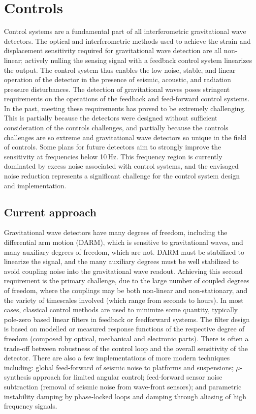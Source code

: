 \section{Controls}
\label{sec:Controls}
Control systems are a fundamental part of all interferometric gravitational wave detectors. The optical and interferometric methods used to achieve the strain and displacement sensitivity required for gravitational wave detection are all non-linear; actively nulling the sensing signal with a feedback control system linearizes the output. 
The control system thus enables the low noise, stable, and linear operation of the detector in the presence of seismic, acoustic, and radiation pressure disturbances.
The detection of gravitational waves poses stringent requirements on the operations of the feedback and feed-forward control systems.
In the past, meeting these requirements has proved to be extremely challenging.
This is partially because the detectors were designed without sufficient consideration of the controls challenges, and partially because the controls challenges are so extreme and gravitational wave detectors so unique in the field of controls.
Some plans for future detectors aim to strongly improve the sensitivity at frequencies below 10\,Hz. This frequency region is currently dominated by excess noise associated with control systems, and the envisaged noise reduction represents a significant challenge for the control system design and implementation.

\subsection{Current approach}
Gravitational wave detectors have many degrees of freedom,  including the differential arm motion (DARM), which is sensitive to gravitational waves, and many auxiliary degrees of freedom, which are not. DARM must be stabilized to linearize the signal, and the many auxiliary degrees must be well stabilized to avoid coupling noise into the gravitational wave readout. Achieving this second requirement is the primary challenge, due to the large number of coupled degrees of freedom, where the couplings may be both non-linear and non-stationary, and the variety of timescales involved (which range from seconds to hours).
In most cases, classical control methods are used to minimize some quantity, typically pole-zero based linear filters in feedback or feedforward systems.
The filter design is based on modelled or measured response functions of the respective degree of freedom (composed by optical, mechanical and electronic parts). There is often a trade-off between robustness of the control loop and the overall sensitivity of the detector.
There are also a few implementations of more modern techniques including:
global feed-forward of seismic noise to platforms and suspensions; $\mu$-synthesis approach for limited angular control; feed-forward sensor noise subtraction (removal of seismic noise from wave-front sensors); and parametric instability damping by phase-locked loops and damping through aliasing of high frequency signals.

